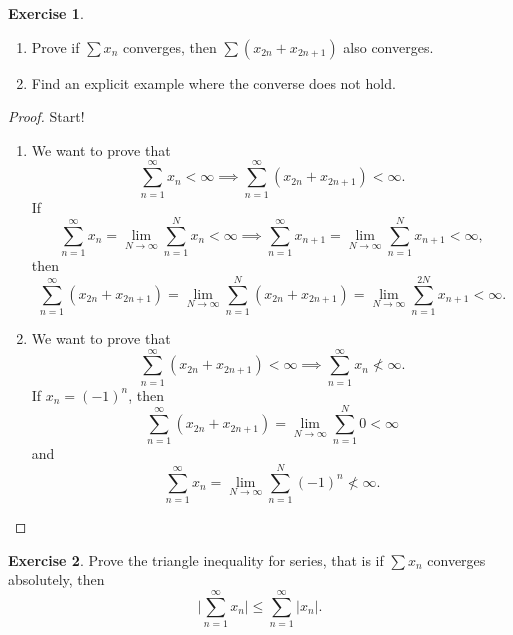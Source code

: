 \documentclass[12pt]{article}
\theoremstyle{definition}
\newtheorem{exercise}{Exercise}
\begin{document}
\begin{exercise}
    \hfill
    \begin{enumerate}[label=\alph*)]
        \item Prove if $\sum x_n$ converges, then $\sum (x_{2n} + x_{2n + 1})$ also converges.
        \item Find an explicit example where the converse does not hold.
    \end{enumerate}
\end{exercise}

\begin{proof}
    Start!
    \begin{enumerate}[label=\alph*)]
        \item We want to prove that
        \[
            \sum_{n = 1}^{\infty}x_n < \infty \implies \sum_{n = 1}^{\infty}(x_{2n} + x_{2n + 1}) < \infty.
        \]
        If
        \[
            \sum_{n = 1}^{\infty}x_n = \lim_{N \to \infty}\sum_{n = 1}^{N}x_n < \infty \implies \sum_{n = 1}^{\infty}x_{n + 1} = \lim_{N \to \infty}\sum_{n = 1}^{N}x_{n + 1} < \infty,
        \]
        then
        \[
            \sum_{n = 1}^{\infty}(x_{2n} + x_{2n + 1}) = \lim_{N \to \infty}\sum_{n = 1}^{N}(x_{2n} + x_{2n + 1}) = \lim_{N \to \infty}\sum_{n = 1}^{2N}x_{n + 1} < \infty.
        \]
        \item We want to prove that
        \[
            \sum_{n = 1}^{\infty}(x_{2n} + x_{2n + 1}) < \infty \implies \sum_{n = 1}^{\infty}x_n \not < \infty.  
        \]
        If $x_n = (-1)^n$, then
        \[
            \sum_{n = 1}^{\infty}(x_{2n} + x_{2n + 1}) = \lim_{N \to \infty}\sum_{n = 1}^N0 < \infty
        \]
        and
        \[
            \sum_{n = 1}^{\infty}x_n = \lim_{N \to \infty}\sum_{n = 1}^N(-1)^n \not < \infty.
        \]
    \end{enumerate}
\end{proof}

\begin{exercise}
    Prove the triangle inequality for series, that is if \(\sum x_n\) converges absolutely, then
    \[
        \bigg \vert \sum_{n = 1}^{\infty}x_n \bigg \vert \leq \sum_{n = 1}^{\infty}\vert x_n \vert.
    \]
\end{exercise}
\end{document}
